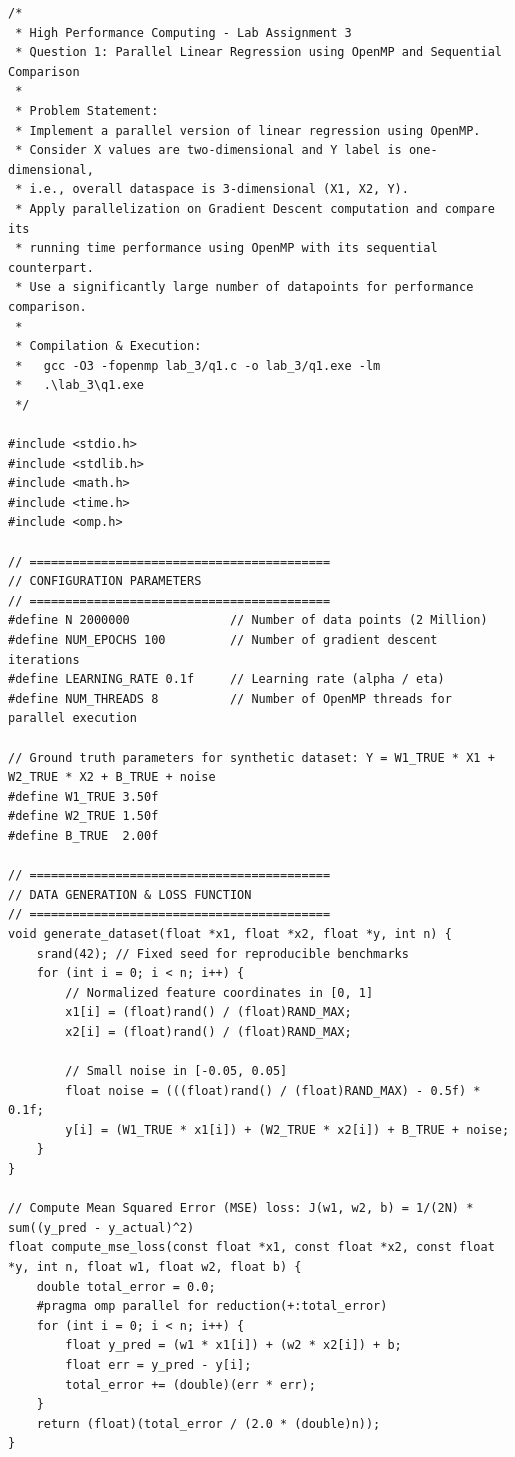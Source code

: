 \documentclass[12pt]{article}
\begin{document}
\begin{lstlisting}
/*
 * High Performance Computing - Lab Assignment 3
 * Question 1: Parallel Linear Regression using OpenMP and Sequential Comparison
 * 
 * Problem Statement:
 * Implement a parallel version of linear regression using OpenMP.
 * Consider X values are two-dimensional and Y label is one-dimensional,
 * i.e., overall dataspace is 3-dimensional (X1, X2, Y).
 * Apply parallelization on Gradient Descent computation and compare its
 * running time performance using OpenMP with its sequential counterpart.
 * Use a significantly large number of datapoints for performance comparison.
 * 
 * Compilation & Execution:
 *   gcc -O3 -fopenmp lab_3/q1.c -o lab_3/q1.exe -lm
 *   .\lab_3\q1.exe
 */

#include <stdio.h>
#include <stdlib.h>
#include <math.h>
#include <time.h>
#include <omp.h>

// ==========================================
// CONFIGURATION PARAMETERS
// ==========================================
#define N 2000000              // Number of data points (2 Million)
#define NUM_EPOCHS 100         // Number of gradient descent iterations
#define LEARNING_RATE 0.1f     // Learning rate (alpha / eta)
#define NUM_THREADS 8          // Number of OpenMP threads for parallel execution

// Ground truth parameters for synthetic dataset: Y = W1_TRUE * X1 + W2_TRUE * X2 + B_TRUE + noise
#define W1_TRUE 3.50f
#define W2_TRUE 1.50f
#define B_TRUE  2.00f

// ==========================================
// DATA GENERATION & LOSS FUNCTION
// ==========================================
void generate_dataset(float *x1, float *x2, float *y, int n) {
    srand(42); // Fixed seed for reproducible benchmarks
    for (int i = 0; i < n; i++) {
        // Normalized feature coordinates in [0, 1]
        x1[i] = (float)rand() / (float)RAND_MAX;
        x2[i] = (float)rand() / (float)RAND_MAX;

        // Small noise in [-0.05, 0.05]
        float noise = (((float)rand() / (float)RAND_MAX) - 0.5f) * 0.1f;
        y[i] = (W1_TRUE * x1[i]) + (W2_TRUE * x2[i]) + B_TRUE + noise;
    }
}

// Compute Mean Squared Error (MSE) loss: J(w1, w2, b) = 1/(2N) * sum((y_pred - y_actual)^2)
float compute_mse_loss(const float *x1, const float *x2, const float *y, int n, float w1, float w2, float b) {
    double total_error = 0.0;
    #pragma omp parallel for reduction(+:total_error)
    for (int i = 0; i < n; i++) {
        float y_pred = (w1 * x1[i]) + (w2 * x2[i]) + b;
        float err = y_pred - y[i];
        total_error += (double)(err * err);
    }
    return (float)(total_error / (2.0 * (double)n));
}


\end{lstlisting}
\end{document}
